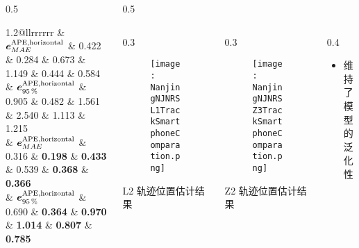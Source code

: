 \begin{frame}
\begin{columns}[t]
\begin{column}{0.5\textwidth}
{{\begin{tabular*}{1.2\linewidth}{@{\extracolsep{\fill}}llrrrrrr}
				& $\vb*{e}^{\mathrm{APE,horizontal}}_{MAE}$ & 0.422 & 0.284 & 0.673 & 1.149 & 0.444 & 0.584 \\
				& $\vb*{e}^{\mathrm{APE,horizontal}}_{\SI{95}{\percent}}$ & 0.905 & 0.482 & 1.561 & 2.540 & 1.113 & 1.215 \\
				\midrule
				& $\vb*{e}^{\mathrm{APE,horizontal}}_{MAE}$ & 0.316 & \textbf{0.198} & \textbf{0.433} & 0.539 & \textbf{0.368} & \textbf{0.366} \\
				& $\vb*{e}^{\mathrm{APE,horizontal}}_{\SI{95}{\percent}}$ & 0.690 & \textbf{0.364} & \textbf{0.970} & \textbf{1.014} & \textbf{0.807} & \textbf{0.785} \\
				\bottomrule 
			\end{tabular*} 	
		}}
		\end{column}   
		\begin{column}{0.5\textwidth}
		    \vspace{-4.5cm}
			\begin{columns}[t]
					\begin{column}{0.3\textwidth}
					   	\begin{figure}
						    \texttt{[image: NanjingNJNRSL1TrackSmartphoneComparation.png]}
					   	\end{figure}
					   	\vspace{-0.5cm}
		   			   	\hspace{0.0cm} {\tiny L2 轨迹位置估计结果}
					\end{column}   
					\begin{column}{0.3\textwidth}
					   	\begin{figure}
					   	\centering
					   	    \texttt{[image: NanjingNJNRSZ3TrackSmartphoneComparation.png]}
					   	\end{figure}
					   	\vspace{-0.5cm}
		   			   	\hspace{0.0cm} {\tiny Z2 轨迹位置估计结果}
					\end{column}
					\begin{column}{0.4\textwidth}
					    \vspace{1cm}
						{\small 						
							\begin{itemize}
								\item 维持了模型的泛化性
							\end{itemize}
						}
					\end{column}
				\end{columns}
		\end{column}
	\end{columns}
\end{frame}

